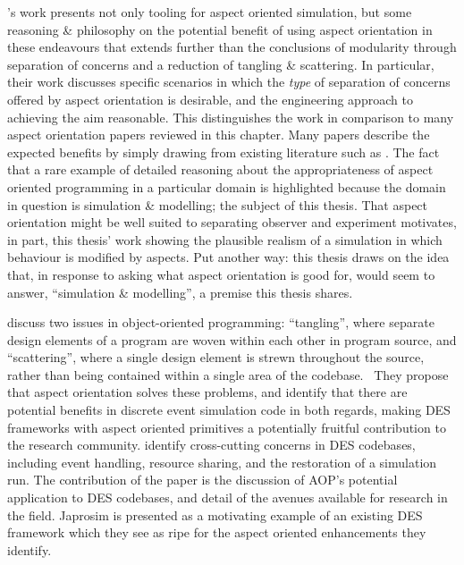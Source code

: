 \citeauthor{gulyas1999use}'s work presents not only tooling for
aspect oriented simulation, but some reasoning \& philosophy on the potential
benefit of using aspect orientation in these endeavours that extends further
than the conclusions of modularity through separation of concerns and a
reduction of tangling \& scattering. In particular, their work discusses
specific scenarios in which the \emph{type} of separation of concerns offered by
aspect orientation is desirable, and the engineering approach to achieving the
aim reasonable. This distinguishes the work in comparison to many aspect
orientation papers reviewed in this chapter. Many papers describe the expected
benefits by simply drawing from existing literature such as
\cite{kiczales1997aspect}. The fact that a rare example of detailed reasoning
about the appropriateness of aspect oriented programming in a particular domain
is highlighted because the domain in question is simulation \& modelling; the
subject of this thesis. That aspect orientation might be well suited to
separating observer and experiment motivates, in part, this thesis' work showing
the plausible realism of a simulation in which behaviour is modified by aspects.
Put another way: this thesis draws on the idea that, in response to
\citeauthor{steimann06paradoxical} asking what aspect orientation is good for,
\citeauthor{gulyas1999use} would seem to answer, ``simulation \& modelling'', a
premise this thesis shares.

\citeauthor{chibani2013toward} discuss two issues in object-oriented
programming: ``tangling'', where separate design elements of a program are woven
within each other in program source, and ``scattering'', where a single design
element is strewn throughout the source, rather than being contained within a
single area of the codebase.~
They propose that aspect orientation solves these problems, and identify that
there are potential benefits in discrete event simulation code in both regards,
making DES frameworks with aspect oriented primitives a potentially fruitful
contribution to the research community. \citeauthor{chibani2013toward} identify
cross-cutting concerns in DES codebases, including event handling, resource
sharing, and the restoration of a simulation run. The contribution of the paper
is the discussion of AOP's potential application to DES codebases, and detail of
the avenues available for research in the field. Japrosim is presented as a
motivating example of an existing DES framework which they see as ripe for the
aspect oriented enhancements they identify.


